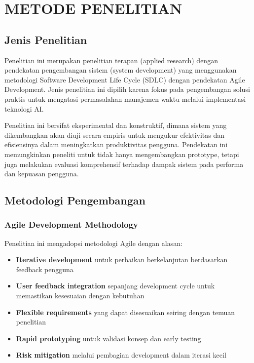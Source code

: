 \chapter{METODE PENELITIAN}
\thispagestyle{plain}

\section{Jenis Penelitian}

Penelitian ini merupakan penelitian terapan (applied research) dengan pendekatan pengembangan sistem (system development) yang menggunakan metodologi Software Development Life Cycle (SDLC) dengan pendekatan Agile Development. Jenis penelitian ini dipilih karena fokus pada pengembangan solusi praktis untuk mengatasi permasalahan manajemen waktu melalui implementasi teknologi AI.

Penelitian ini bersifat eksperimental dan konstruktif, dimana sistem yang dikembangkan akan diuji secara empiris untuk mengukur efektivitas dan efisiensinya dalam meningkatkan produktivitas pengguna. Pendekatan ini memungkinkan peneliti untuk tidak hanya mengembangkan prototype, tetapi juga melakukan evaluasi komprehensif terhadap dampak sistem pada performa dan kepuasan pengguna.

\section{Metodologi Pengembangan}

\subsection{Agile Development Methodology}

Penelitian ini mengadopsi metodologi Agile dengan alasan:

\begin{itemize}
\item \textbf{Iterative development} untuk perbaikan berkelanjutan berdasarkan feedback pengguna
\item \textbf{User feedback integration} sepanjang development cycle untuk memastikan kesesuaian dengan kebutuhan
\item \textbf{Flexible requirements} yang dapat disesuaikan seiring dengan temuan penelitian
\item \textbf{Rapid prototyping} untuk validasi konsep dan early testing
\item \textbf{Risk mitigation} melalui pembagian development dalam iterasi kecil
\end{itemize}

